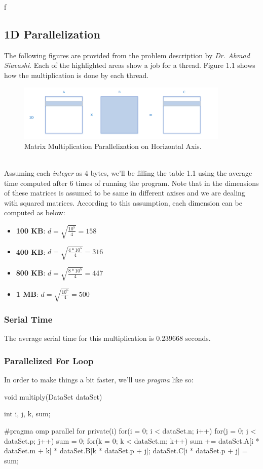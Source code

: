 f\documentclass[12pt]{article}
\numberwithin{equation}{section}
\numberwithin{table}{section}
\numberwithin{figure}{section}
\begin{document}
\subsection{1D Parallelization}
The following figures are provided from the problem description by \textit{Dr. Ahmad Siavashi}. Each of the highlighted areas show a job for a thread. Figure 1.1 shows how the multiplication is done by each thread.
\begin{figure}[!h]\centering
	\includegraphics[width=0.9\textwidth]{one_dimensional.png}
	\caption{Matrix Multiplication Parallelization on Horizontal Axis.}
	\label{figsolplot}
\end{figure}\\
Assuming each \textit{integer} as 4 bytes, we'll be filling the table 1.1 using the average time computed after 6 times of running the program. Note that in the dimensions of these matrices is assumed to be same in different axises and we are dealing with squared matrices. According to this assumption, each dimension can be computed as below:
\begin{itemize}
	\item \textbf{100 KB}:  $d = \sqrt{\frac{10^5}{4}} = 158$
	\item \textbf{400 KB}:  $d = \sqrt{\frac{4 * 10^5}{4}} = 316$
	\item \textbf{800 KB}:  $d = \sqrt{\frac{8 * 10^5}{4}} = 447$
	\item \textbf{1 MB}:  $d = \sqrt{\frac{10^{6}}{4}} = 500$
\end{itemize}
\subsubsection{Serial Time}
The average serial time for this multiplication is $0.239668$ seconds.
\subsubsection{Parallelized For Loop}
In order to make things a bit faster, we'll use \textit{pragma} like so:
\begin{cpp}
		void multiply(DataSet dataSet){
			int i, j, k, sum;
			
			#pragma omp parallel for private(i)
			for(i = 0; i < dataSet.n; i++){
				for(j = 0; j < dataSet.p; j++){
					sum = 0;
					for(k = 0; k < dataSet.m; k++){
						sum += dataSet.A[i * dataSet.m + k] * dataSet.B[k * dataSet.p + j];
					}
					dataSet.C[i * dataSet.p + j] = sum;
				}
			}
		}
\end{cpp}
\end{document}
